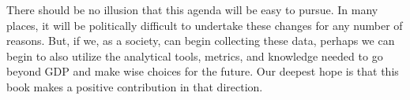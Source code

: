 There should be no illusion that this agenda will be easy to pursue.
In many places, 
it will be politically difficult to undertake these changes
for any number of reasons.
But, if we, as a society, can begin collecting these data, 
perhaps we can begin to also utilize
the analytical tools, metrics, and knowledge
needed to go beyond GDP 
and make wise choices for the future.
Our deepest hope is that this book makes a positive contribution in that direction.








%
%


